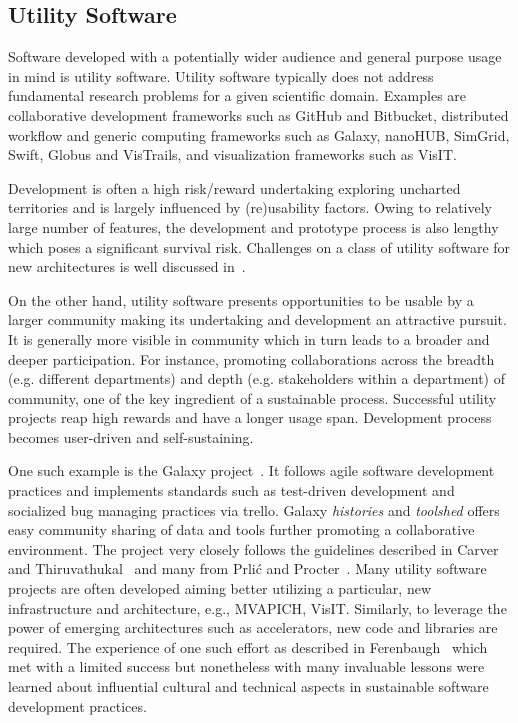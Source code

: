 \documentclass[11pt, oneside]{amsart}
\newcommand{\toolname}[1] {\textsf{#1}}
\begin{document}
\subsection{Utility Software}
Software developed with a potentially wider audience and general purpose usage
in mind is utility software. Utility software typically does not address
fundamental research problems for a given scientific domain. Examples are
collaborative development frameworks such as \toolname{GitHub} and
\toolname{Bitbucket}, distributed workflow and generic computing frameworks
such as \toolname{Galaxy}, \toolname{nanoHUB}, \toolname{SimGrid}, \toolname{Swift},
\toolname{Globus} and \toolname{VisTrails}, and visualization frameworks such as
\toolname{VisIT}.

Development is often a high risk/reward undertaking exploring uncharted
territories and is largely influenced by (re)usability factors. Owing to
relatively large number of features, the development and prototype process is
also lengthy which poses a significant survival risk. Challenges on a class of
utility software for new architectures is well discussed
in~\cite{Ferenbaugh_WSSSPE}.

On the other hand, utility software presents opportunities to be usable by a
larger community making its undertaking and development an attractive pursuit.
It is generally more visible in community which in turn leads to a broader and
deeper participation. For instance, promoting collaborations across the breadth
(e.g.  different departments) and depth (e.g. stakeholders within a department)
of community, one of the key ingredient of a sustainable process. Successful
utility projects reap high rewards and have a longer usage span. Development
process becomes user-driven and self-sustaining.

One such example is the \toolname{Galaxy} project~\cite{Galaxy}. It follows agile software
development practices and implements standards such as test-driven development
and socialized bug managing practices via \toolname{trello}. Galaxy
\emph{histories} and \emph{toolshed} offers easy community sharing of data and
tools further promoting a collaborative environment. The project very closely
follows the guidelines described in Carver and Thiruvathukal~\cite{Carver_WSSSPE} and many
from Prli\'{c} and Procter~\cite{Prlic_WSSSPE}. Many utility software projects are often developed
aiming better utilizing a particular, new infrastructure and architecture,
e.g., \toolname{MVAPICH}, \toolname{VisIT}. Similarly, to leverage the power of
emerging architectures such as accelerators, new code and libraries are
required. The experience of one such effort as described
in Ferenbaugh~\cite{Ferenbaugh_WSSSPE} which met with a limited success but nonetheless
with many invaluable lessons were learned about influential cultural and
technical aspects in sustainable software development practices.
\end{document}
